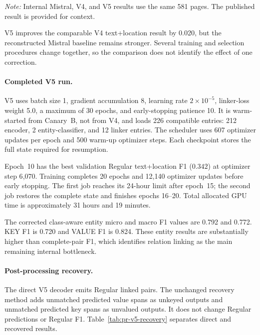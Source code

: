 \documentclass[11pt,a4paper]{article}
\begin{document}
\noindent\emph{Note:} Internal Mistral, V4, and V5 results use the same 581
pages. The published result is provided for context.

V5 improves the comparable V4 text+location result by 0.020, but the
reconstructed Mistral baseline remains stronger. Several training and selection
procedures change together, so the comparison does not identify the effect of
one correction.

\paragraph{Completed V5 run.}
V5 uses batch size 1, gradient accumulation 8, learning rate
$2\times10^{-5}$, linker-loss weight 5.0, a maximum of 30 epochs, and
early-stopping patience 10. It is warm-started from Canary~B, not from V4, and
loads 226 compatible entries: 212 encoder, 2 entity-classifier, and 12 linker
entries. The scheduler uses 607 optimizer updates per epoch and 500 warm-up
optimizer steps. Each checkpoint stores the full state required for resumption.

Epoch~10 has the best validation Regular text+location F1 ($0.342$) at optimizer
step 6{,}070. Training completes 20 epochs and 12{,}140 optimizer updates before
early stopping. The first job reaches its 24-hour limit after epoch~15; the
second job restores the complete state and finishes epochs 16--20. Total
allocated GPU time is approximately 31 hours and 19 minutes.

The corrected class-aware entity micro and macro F1 values are 0.792 and 0.772.
KEY F1 is 0.720 and VALUE F1 is 0.824. These entity results are substantially
higher than complete-pair F1, which identifies relation linking as the main
remaining internal bottleneck.

\paragraph{Post-processing recovery.}
The direct V5 decoder emits Regular linked pairs. The unchanged recovery method
adds unmatched predicted value spans as unkeyed outputs and unmatched predicted
key spans as unvalued outputs. It does not change Regular predictions or
Regular F1. Table~\ref{tab:pr-v5-recovery} separates direct and recovered
results.
\end{document}
